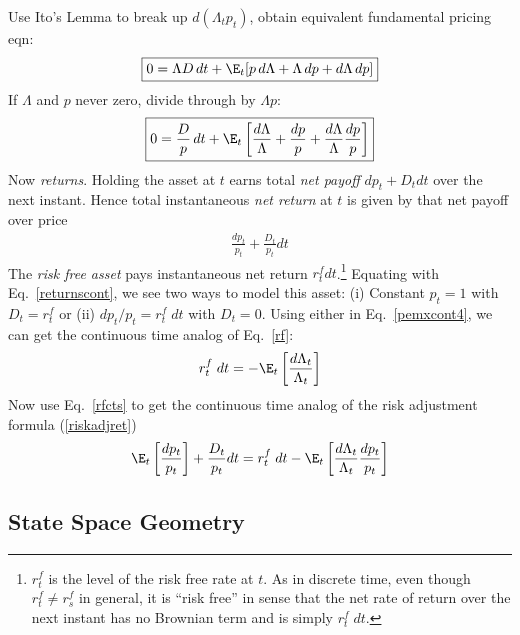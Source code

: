 \documentclass[12pt]{article}
\theoremstyle{plain}
\theoremstyle{definition}
\theoremstyle{remark}
\begin{document}
\begin{multicols*}{2}
Use Ito's Lemma to break up $d(\Lambda_tp_t)$, obtain equivalent
fundamental pricing eqn:
\begin{align*}
  \boxed{%
  0 = \Lambda D \,dt
  + \E_t[p \,d\Lambda + \Lambda \, dp + d\Lambda \,dp]
  }
\end{align*}
If $\Lambda$ and $p$ never zero, divide through by $\Lambda p$:
\begin{align}
  \boxed{%
  0 = \frac{D}{p} \,dt
  + \E_t\left[
    \frac{d\Lambda}{\Lambda} + \frac{dp}{p}
    + \frac{d\Lambda}{\Lambda}\frac{dp}{p}
    \right]
  }
  \label{pemxcont4}
\end{align}
Now \emph{returns}.
Holding the asset at $t$ earns total \emph{net payoff} $dp_t + D_t dt$
over the next instant. Hence total instantaneous \emph{net return} at
$t$
is given by that net payoff over price
\begin{align}
  \frac{dp_t}{p_t}
  + \frac{D_t}{p_t} dt
  \label{returnscont}
\end{align}
The \emph{risk free asset} pays instantaneous net return
$r^f_t dt$.\footnote{%
  $r^f_t$ is the level of the risk free rate at $t$.
  As in discrete time, even though $r^f_t\neq r^f_s$ in general, it is
  ``risk free'' in sense that the net rate of return over the next
  instant has no Brownian term and is simply $r^f_t\;dt$.
}
Equating with Eq.~\ref{returnscont}, we see two ways to model this
asset: (i) Constant $p_t=1$ with $D_t=r_t^f$
or (ii) $dp_t/p_t=r^f_t\;dt$ with $D_t=0$.
Using either in Eq.~\ref{pemxcont4}, we can get the continuous time
analog of Eq.~\ref{rf}:
\begin{align}
  r^f_t\;dt =
  -\E_t\left[ \frac{d\Lambda_t}{\Lambda_t} \right]
  \label{rfcts}
\end{align}
Now use Eq.~\ref{rfcts} to get the continuous time analog of the risk
adjustment formula (\ref{riskadjret})
\begin{align*}
  \E_t\left[
     \frac{dp_t}{p_t}
  \right]
  +
  \frac{D_t}{p_t} dt
  =
  r^f_t\;dt
  - \E_t\left[
     \frac{d\Lambda_t}{\Lambda_t}\frac{dp_t}{p_t}
    \right]
\end{align*}


\clearpage
\subsection{State Space Geometry}


\end{multicols*}
\end{document}
